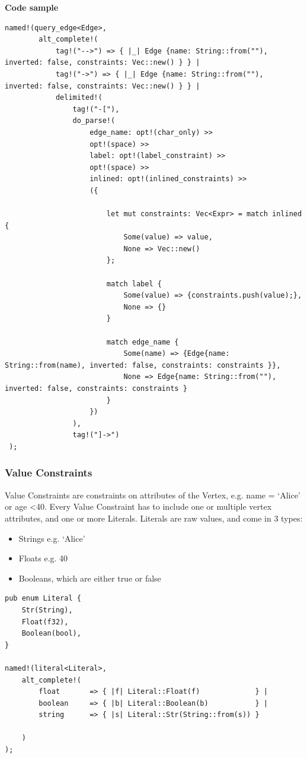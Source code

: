 \documentclass[11pt,singlecolumn]{scrartcl}
\begin{document}
\textbf{Code sample}
 \begin{lstlisting}
named!(query_edge<Edge>,
        alt_complete!(
            tag!("-->") => { |_| Edge {name: String::from(""), inverted: false, constraints: Vec::new() } } |
            tag!("->") => { |_| Edge {name: String::from(""), inverted: false, constraints: Vec::new() } } | 
            delimited!(
                tag!("-["),
                do_parse!(
                    edge_name: opt!(char_only) >> 
                    opt!(space) >>
                    label: opt!(label_constraint) >>
                    opt!(space) >>
                    inlined: opt!(inlined_constraints) >>
                    ({
                        
                        let mut constraints: Vec<Expr> = match inlined {
                            Some(value) => value,
                            None => Vec::new()
                        };

                        match label {
                            Some(value) => {constraints.push(value);},
                            None => {}
                        }

                        match edge_name {
                            Some(name) => {Edge{name: String::from(name), inverted: false, constraints: constraints }},
                            None => Edge{name: String::from(""), inverted: false, constraints: constraints }
                        }
                    })                
                ),
                tag!("]->")
 );
 \end{lstlisting}
 \clearpage
 \subsubsection{Value Constraints}
 Value Constraints are constraints on attributes of the Vertex, e.g. name = `Alice' or age \textless  40. Every Value Constraint has to include one or multiple vertex attributes, and one or more Literals. Literals are raw values, and come in 3 types:
 \begin{itemize} 
\item Strings e.g. `Alice'
\item Floats e.g. 40
\item Booleans, which are either true or false
\end{itemize}
 
 \begin{lstlisting}
pub enum Literal {
    Str(String),
    Float(f32),
    Boolean(bool),
} 
 
named!(literal<Literal>,
    alt_complete!(
        float       => { |f| Literal::Float(f)             } |
        boolean     => { |b| Literal::Boolean(b)           } |
        string      => { |s| Literal::Str(String::from(s)) } 
            
    )
);
 \end{lstlisting}
 
\end{document}
